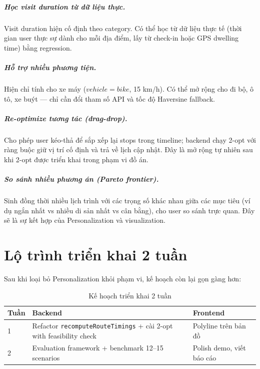 \documentclass[12pt,a4paper]{report}
\begin{document}
\paragraph{Học visit duration từ dữ liệu thực.} Visit duration hiện cố định theo category. Có thể học từ dữ liệu thực tế (thời gian user thực sự dành cho mỗi địa điểm, lấy từ check-in hoặc GPS dwelling time) bằng regression.

\paragraph{Hỗ trợ nhiều phương tiện.} Hiện chỉ tính cho xe máy ($vehicle=bike$, 15 km/h). Có thể mở rộng cho đi bộ, ô tô, xe buýt --- chỉ cần đổi tham số API và tốc độ Haversine fallback.

\paragraph{Re-optimize tương tác (drag-drop).} Cho phép user kéo-thả để sắp xếp lại stops trong timeline; backend chạy 2-opt với ràng buộc giữ vị trí cố định và trả về lịch cập nhật. Đây là mở rộng tự nhiên sau khi 2-opt được triển khai trong phạm vi đồ án.

\paragraph{So sánh nhiều phương án (Pareto frontier).} Sinh đồng thời nhiều lịch trình với các trọng số khác nhau giữa các mục tiêu (ví dụ ngắn nhất vs nhiều di sản nhất vs cân bằng), cho user so sánh trực quan. Đây sẽ là sự kết hợp của Personalization và visualization.

\chapter{Lộ trình triển khai 2 tuần}

Sau khi loại bỏ Personalization khỏi phạm vi, kế hoạch còn lại gọn gàng hơn:

\begin{table}[H]
\centering
\caption{Kế hoạch triển khai 2 tuần}
\begin{tabular}{lll}
\toprule
\textbf{Tuần} & \textbf{Backend} & \textbf{Frontend} \\
\midrule
1 & Refactor \texttt{recomputeRouteTimings} + cài 2-opt with feasibility check & Polyline trên bản đồ \\
2 & Evaluation framework + benchmark 12--15 scenarios & Polish demo, viết báo cáo \\
\bottomrule
\end{tabular}
\end{table}
\end{document}

